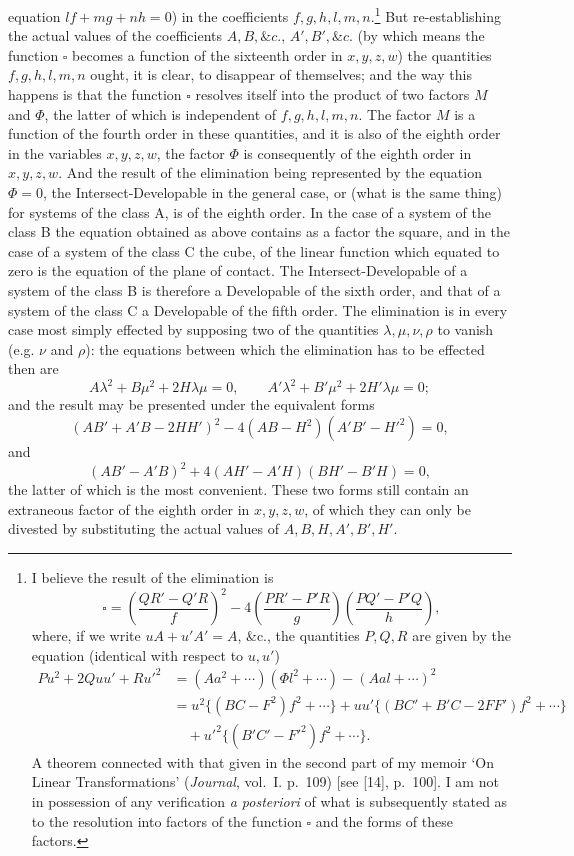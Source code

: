 \documentclass[11pt]{article}
\newcommand{\sq}{\square}
\begin{document}
\noindent equation $lf+mg+nh=0$) in the coefficients $f,g,h,l,m,n$.\footnote{I believe the
result of the elimination is
\[
\sq=\left(\frac{QR'-Q'R}{f}\right)^2-4
\left(\frac{PR'-P'R}{g}\right)
\left(\frac{PQ'-P'Q}{h}\right),
\]
where, if we write $uA+u'A'=A$, \&c., the quantities $P,Q,R$ are given by the
equation (identical with respect to $u,u'$)
\[
\begin{aligned}
Pu^2+2Quu'+Ru'^2
&=(Aa^2+\cdots)(\Phi l^2+\cdots)-(Aal+\cdots)^2\\
&=u^2\{(BC-F^2)f^2+\cdots\}
+uu'\{(BC'+B'C-2FF')f^2+\cdots\}\\
&\quad +u'^2\{(B'C'-F'^2)f^2+\cdots\}.
\end{aligned}
\]
A theorem connected with that given in the second part of my memoir `On Linear
Transformations' (\textit{Journal}, vol.~I. p.~109) [see [14], p.~100]. I am not in
possession of any verification \textit{a posteriori} of what is subsequently stated as to
the resolution into factors of the function $\sq$ and the forms of these factors.}
But re-establishing the actual values of the coefficients $A,B,\&c.$, $A',B',\&c.$
(by which means the function $\sq$ becomes a function of the sixteenth order in
$x,y,z,w$) the quantities $f,g,h,l,m,n$ ought, it is clear, to disappear of themselves;
and the way this happens is that the function $\sq$ resolves itself into the product
of two factors $M$ and $\Phi$, the latter of which is independent of $f,g,h,l,m,n$.
The factor $M$ is a function of the fourth order in these quantities, and it is also
of the eighth order in the variables $x,y,z,w$, the factor $\Phi$ is consequently of
the eighth order in $x,y,z,w$. And the result of the elimination being represented
by the equation $\Phi=0$, the Intersect-Developable in the general case, or (what is
the same thing) for systems of the class A, is of the eighth order. In the case of a
system of the class B the equation obtained as above contains as a factor the square,
and in the case of a system of the class C the cube, of the linear function which
equated to zero is the equation of the plane of contact. The Intersect-Developable of
a system of the class B is therefore a Developable of the sixth order, and that of a
system of the class C a Developable of the fifth order. The elimination is in every
case most simply effected by supposing two of the quantities $\lambda,\mu,\nu,\rho$ to
vanish (e.g. $\nu$ and $\rho$): the equations between which the elimination has to be
effected then are
\[
        A\lambda^2+B\mu^2+2H\lambda\mu=0,\qquad
        A'\lambda^2+B'\mu^2+2H'\lambda\mu=0;
\]
and the result may be presented under the equivalent forms
\[
        (AB'+A'B-2HH')^2-4(AB-H^2)(A'B'-H'^2)=0,
\]
and
\[
        (AB'-A'B)^2+4(AH'-A'H)(BH'-B'H)=0,
\]
the latter of which is the most convenient. These two forms still contain an
extraneous factor of the eighth order in $x,y,z,w$, of which they can only be
divested by substituting the actual values of $A,B,H,A',B',H'$.
\end{document}
